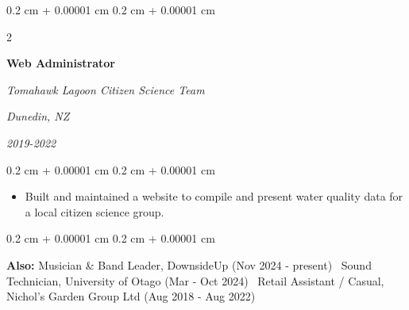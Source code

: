 \documentclass[10pt, letterpaper]{article}
\newenvironment{highlights}{
    \begin{itemize}[
        topsep=0.10 cm,
        parsep=0.10 cm,
        partopsep=0pt,
        itemsep=0pt,
        leftmargin=0.4 cm + 10pt
    ]
}{
    \end{itemize}
} %
\newenvironment{onecolentry}{
    \begin{adjustwidth}{
        0.2 cm + 0.00001 cm
    }{
        0.2 cm + 0.00001 cm
    }
}{
    \end{adjustwidth}
} %
\newenvironment{twocolentry}[2][]{
    \onecolentry
    \def\secondColumn{#2}
    \setcolumnwidth{\fill, 4.5 cm}
    \begin{paracol}{2}
}{
    \switchcolumn \raggedleft \secondColumn
    \end{paracol}
    \endonecolentry
} %
\begin{document}
    \vspace{0.2 cm}

    \begin{twocolentry}{
    {\textit{Dunedin, NZ}}    
        
   \textit{2019-2022} }
        \textbf{Web Administrator}
        
        \textit{Tomahawk Lagoon Citizen Science Team}
    \end{twocolentry}
    \vspace{0.10 cm}
    \begin{onecolentry}
        \begin{highlights}
            \item Built and maintained a website to compile and present water quality data for a local citizen science group.
        \end{highlights}
    \end{onecolentry}

    \vspace{0.2 cm}

    \begin{onecolentry}
        \textbf{Also:} Musician \& Band Leader, DownsideUp (Nov 2024 - present) \textbar\ Sound Technician, University of Otago (Mar - Oct 2024) \textbar\ Retail Assistant / Casual, Nichol's Garden Group Ltd (Aug 2018 - Aug 2022)
    \end{onecolentry}



\end{document}
